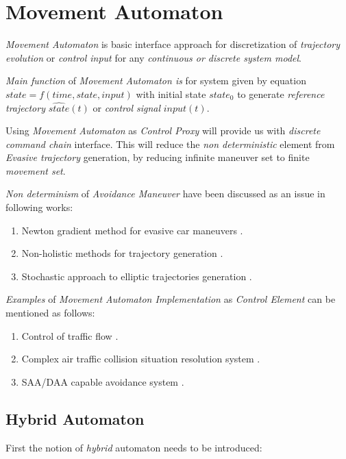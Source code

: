 \section{Movement Automaton}\label{sec:MovementAutomatonBackground}

    \noindent\emph{Movement Automaton} is basic interface approach for discretization of \emph{trajectory evolution}  or \emph{control input} for any \emph{continuous or discrete system model}.
    
    \emph{Main function} of \emph{Movement Automaton is} for system given by equation $\dot{state}=f(time,state,input)$ with initial state $state_0$ to generate \emph{reference trajectory} $\hat{state}(t)$ or \emph{control signal} $input(t)$.
    
    Using \emph{Movement Automaton} as \emph{Control Proxy} will provide us with \emph{discrete command chain} interface. This will reduce the \emph{non deterministic} element from \emph{Evasive trajectory} generation, by reducing infinite maneuver set to finite \emph{movement set}.
    
    \emph{Non determinism} of \emph{Avoidance Maneuver} have been discussed as an issue in following works:
    \begin{enumerate}
        \item Newton gradient method for evasive car maneuvers \cite{vsantin2011combined}.
        \item Non-holistic methods for trajectory generation \cite{pin1990autonomous}.
        \item Stochastic approach to elliptic trajectories generation \cite{andrzejak2001epileptic}.
    \end{enumerate}
    
    \emph{Examples} of \emph{Movement Automaton Implementation} as \emph{Control Element} can be mentioned as follows:
    \begin{enumerate}
        \item Control of traffic flow \cite{kuwata2009real}.
        \item Complex air traffic collision situation resolution system  \cite{frazzoli2001robust,frazzoli2000trajectory}.
        \item SAA/DAA capable avoidance system \cite{gomola2017obstacle}.
    \end{enumerate}


    \subsection{Hybrid Automaton}\label{s:HybridAutomaton}
    \noindent First the notion of  \emph{hybrid} automaton  \cite{lazar2006model,borrelli2006mpc,daws1996tool} needs to be introduced:


